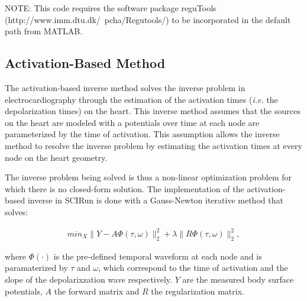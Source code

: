     NOTE: This code requires the software package reguTools (http://www.imm.dtu.dk/~pcha/Regutools/) to be incorporated in the default path from MATLAB.




\subsection{Activation-Based Method}

    The activation-based inverse method solves the inverse problem in electrocardiography through the estimation of the activation times (\emph{i.e.} the depolarization times) on the heart.
    This inverse method assumes that the sources on the heart are modeled with a potentials over time at each node are parameterized  by the time of activation.
    This assumption allows the inverse method to resolve the inverse problem by estimating the activation times at every node on the heart geometry.

    The inverse problem being solved is thus a non-linear optimization problem for which there is no closed-form solution.
    The implementation of the activation-based inverse in SCIRun is done with a Gauss-Newton iterative method that solves:
    \begin{center}
        \begin{eqnarray}
            min_{X} \|Y - A \Phi(\tau, \omega) \|^{2}_{2} + \lambda \| R\Phi(\tau, \omega) \|^{2}_{2},
        \label{eq:inverseSec_actBasedObj}
        \end{eqnarray}
    \end{center}
    where $\Phi(\cdot)$ is the pre-defined temporal waveform at each node and is paramaterized by $\tau$ and $\omega$, which correspond to the time of activation and the slope of the depolarixzation wave respectively.
    $Y$ are the measured body surface potentials, $A$ the forward matrix and $R$ the regularization matrix.

